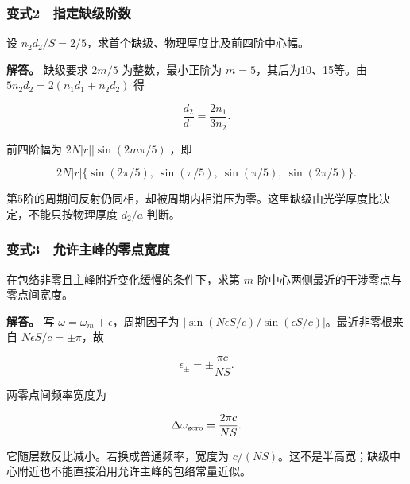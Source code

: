 \documentclass[12pt,a4paper,fontset=fandol]{ctexart}
\begin{document}
\subsubsection{变式2　指定缺级阶数}\label{ux53d8ux5f0f2-ux6307ux5b9aux7f3aux7ea7ux9636ux6570}

设 \(n_2d_2/S=2/5\)，求首个缺级、物理厚度比及前四阶中心幅。

\textbf{解答。} 缺级要求 \(2m/5\) 为整数，最小正阶为
\(m=5\)，其后为10、15等。由 \(5n_2d_2=2(n_1d_1+n_2d_2)\) 得

\[
\frac{d_2}{d_1}=\frac{2n_1}{3n_2}.
\]

前四阶幅为 \(2N|r||\sin(2m\pi/5)|\)，即

\[
2N|r|\{\sin(2\pi/5),\ \sin(\pi/5),\
\sin(\pi/5),\ \sin(2\pi/5)\}.
\]

第5阶的周期间反射仍同相，却被周期内相消压为零。这里缺级由光学厚度比决定，不能只按物理厚度
\(d_2/a\) 判断。

\subsubsection{变式3　允许主峰的零点宽度}\label{ux53d8ux5f0f3-ux5141ux8bb8ux4e3bux5cf0ux7684ux96f6ux70b9ux5bbdux5ea6}

在包络非零且主峰附近变化缓慢的条件下，求第 \(m\)
阶中心两侧最近的干涉零点与零点间宽度。

\textbf{解答。} 写 \(\omega=\omega_m+\epsilon\)，周期因子为
\(|\sin(N\epsilon S/c)/\sin(\epsilon S/c)|\)。最近非零根来自
\(N\epsilon S/c=\pm\pi\)，故

\[
\epsilon_\pm=\pm\frac{\pi c}{NS}.
\]

两零点间频率宽度为

\[
\Delta\omega_{\rm zero}=\frac{2\pi c}{NS}.
\]

它随层数反比减小。若换成普通频率，宽度为
\(c/(NS)\)。这不是半高宽；缺级中心附近也不能直接沿用允许主峰的包络常量近似。
\end{document}
